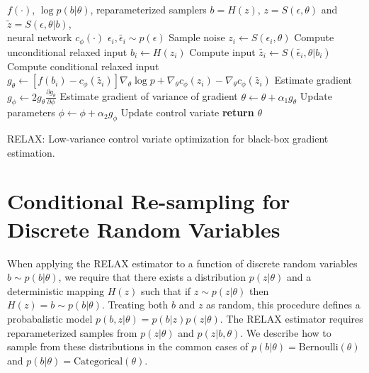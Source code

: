 \documentclass{article}
\newcommand{\RELAX}{{\textnormal{RELAX}}}
\begin{document}
\begin{algorithm}[h]
	\begin{algorithmic}
		\Require $f(\cdot)$, $\log p(b|\theta)$, reparameterized samplers $b = H(z)$, $z = S(\epsilon, \theta)$ and $\tilde{z} = S(\epsilon, \theta | b)$, \\ 
		\hspace{3em} neural network $c_\phi(\cdot)$   
		\State $\epsilon_{i}, \widetilde{\epsilon_i} \sim p(\epsilon)$ \Comment Sample noise
		\State $z_i \leftarrow S(\epsilon_i, \theta)$ \Comment Compute unconditional relaxed input
		\State $b_i \leftarrow H(z_i)$ \Comment Compute input
		\State $\widetilde{z_i} \leftarrow S(\widetilde{\epsilon_i}, \theta | b_i)$ \Comment Compute conditional relaxed input
		\State  $g_\theta \leftarrow \left[f(b_i) - c_{\phi}(\widetilde{z_i}) \right] \nabla_\theta \log p + \nabla_\theta c_\phi(z_i) - \nabla_\theta c_\phi(\widetilde{z_i})$ \Comment Estimate gradient
		\State  $g_\phi \leftarrow 2 g_\theta \frac{\partial g_\theta}{\partial \phi}$ \Comment Estimate gradient of variance of gradient
		\State $\theta \leftarrow \theta + \alpha_1 g_\theta$ \Comment Update parameters
		\State $\phi \leftarrow \phi + \alpha_2 g_\phi$ \Comment Update control variate
		\EndWhile
		\State \textbf{return} $\theta$ 
	\end{algorithmic}
	\caption{\RELAX{}: Low-variance control variate optimization for black-box gradient estimation.}
	\label{relax}
\end{algorithm}





\section{Conditional Re-sampling for Discrete Random Variables}
\label{resample}
When applying the RELAX estimator to a function of discrete random variables $b \sim p(b|\theta)$, we require that there exists a distribution $p(z|\theta)$ and a deterministic mapping $H(z)$ such that if $z \sim p(z|\theta)$ then $H(z) = b \sim p(b|\theta)$. Treating both $b$ and $z$ as random, this procedure defines a probabalistic model $p(b, z | \theta) = p(b|z)p(z|\theta)$. The RELAX estimator requires reparameterized samples from $p(z|\theta)$ and $p(z|b,\theta)$. We describe how to sample from these distributions in the common cases of $p(b|\theta) = \text{Bernoulli}(\theta)$ and $p(b|\theta) = \text{Categorical}(\theta)$.
\end{document}
